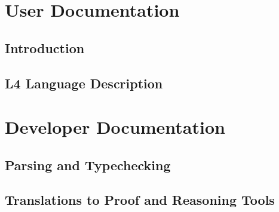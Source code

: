 \documentclass[11pt,a4paper,twoside,headinclude,footexclude]{scrreprt}
\begin{document}




\cleardoublepage


\newpage
\tableofcontents
\listoffigures

\cleardoublepage


\chapter{User Documentation}

\section{Introduction}\label{sec:introduction}



\section{L4 Language Description}\label{sec:language}



\chapter{Developer Documentation}

\section{Parsing and Typechecking}\label{sec:parsing_typechecking}



\section{Translations to Proof and Reasoning Tools}\label{sec:translations}



\newpage


\end{document}
